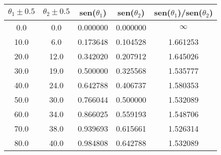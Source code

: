 \begin{tabular}{ccccc}
\toprule
 $\theta_1 \pm 0.5$ &  $\theta_2 \pm 0.5$ &  sen($\theta_1$) &  sen($\theta_2$) & sen($\theta_1$)/sen($\theta_2$) \\
\midrule
                0.0 &                 0.0 &         0.000000 &         0.000000 &                        $\infty$ \\
               10.0 &                 6.0 &         0.173648 &         0.104528 &                        1.661253 \\
               20.0 &                12.0 &         0.342020 &         0.207912 &                        1.645026 \\
               30.0 &                19.0 &         0.500000 &         0.325568 &                        1.535777 \\
               40.0 &                24.0 &         0.642788 &         0.406737 &                        1.580353 \\
               50.0 &                30.0 &         0.766044 &         0.500000 &                        1.532089 \\
               60.0 &                34.0 &         0.866025 &         0.559193 &                        1.548706 \\
               70.0 &                38.0 &         0.939693 &         0.615661 &                        1.526314 \\
               80.0 &                40.0 &         0.984808 &         0.642788 &                        1.532089 \\
\bottomrule
\end{tabular}
